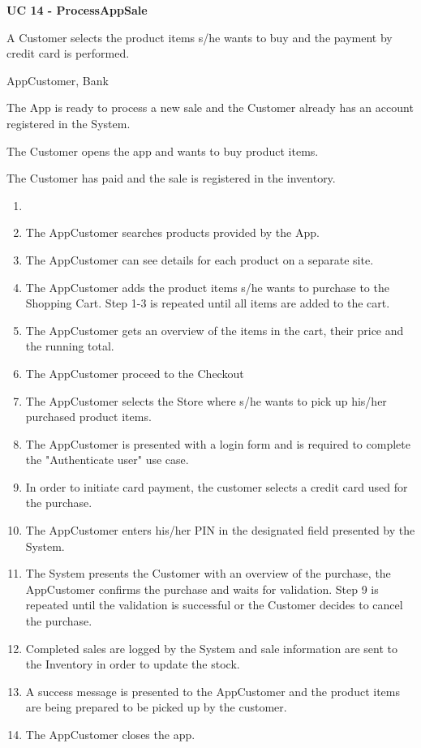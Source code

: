 \textbf{UC 14 - ProcessAppSale}
\begin{description}[font=\normalfont\itshape]

\item[Brief Description] A Customer selects the product items s/he wants to buy and the payment by credit card is performed.

\item[Involved Actors] AppCustomer, Bank

\item[Precondition] The App is ready to process a new sale and the Customer already has an account registered in the System.

\item[Trigger] The Customer opens the app and wants to buy product items.

\item[Postcondition] The Customer has paid and the sale is registered in the inventory.

\item[Standard Process]

\begin{enumerate}[leftmargin=.5cm]
\item[]
	\item The AppCustomer searches products provided by the App.
	\item The AppCustomer can see details for each product on a separate site.
	\item The AppCustomer adds the product items s/he wants to purchase to the Shopping Cart. Step 1-3 is repeated until all items are added to the cart.
	\item The AppCustomer gets an overview of the items in the cart, their price and the running total.
	\item The AppCustomer proceed to the Checkout 
	\item The AppCustomer selects the Store where s/he wants to pick up his/her	purchased product items. 
	\item The AppCustomer is presented with a login form and is required to complete the "Authenticate user" use case.
	\item In order to initiate card payment, the customer selects a credit card used for the purchase.
	\item The AppCustomer enters his/her PIN in the designated field presented by the System.
	\item The System presents the Customer with an overview of the purchase, the AppCustomer confirms the purchase and waits for validation. Step 9 is repeated until the validation is successful or the Customer decides to cancel the purchase.
	\item Completed sales are logged by the System and sale information are sent to	the Inventory in order to update the stock.
	\item A success message is presented to the AppCustomer and the product items
	are being prepared to be picked up by the customer.
	\item The AppCustomer closes the app.
\end{enumerate}


\end{description}
